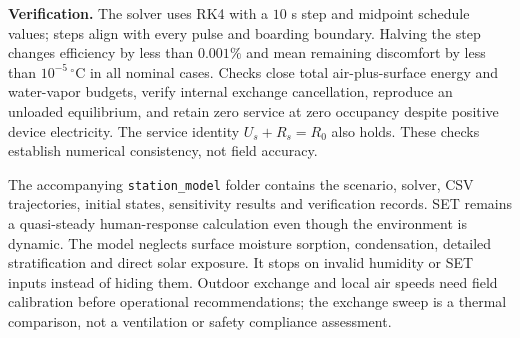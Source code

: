 \noindent\textbf{Verification.} The solver uses RK4 with a $10$ s step and midpoint schedule values; steps align with every pulse and boarding boundary. Halving the step changes efficiency by less than $0.001\%$ and mean remaining discomfort by less than $10^{-5}\,^{\circ}\mathrm C$ in all nominal cases. Checks close total air-plus-surface energy and water-vapor budgets, verify internal exchange cancellation, reproduce an unloaded equilibrium, and retain zero service at zero occupancy despite positive device electricity. The service identity $U_s+R_s=R_0$ also holds. These checks establish numerical consistency, not field accuracy.

The accompanying \texttt{station\_model} folder contains the scenario, solver, CSV trajectories, initial states, sensitivity results and verification records. SET remains a quasi-steady human-response calculation even though the environment is dynamic. The model neglects surface moisture sorption, condensation, detailed stratification and direct solar exposure. It stops on invalid humidity or SET inputs instead of hiding them. Outdoor exchange and local air speeds need field calibration before operational recommendations; the exchange sweep is a thermal comparison, not a ventilation or safety compliance assessment.
